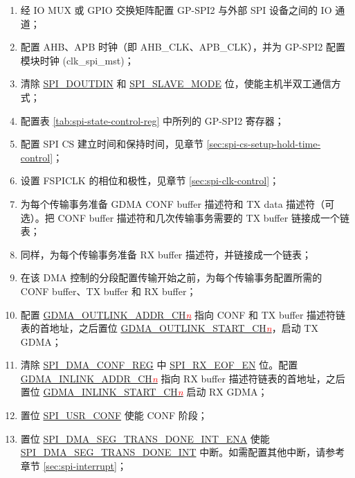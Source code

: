 \documentclass[main\_\_CN.tex]{subfiles}
\begin{document}
 \begin{enumerate}
    \item 经 IO MUX 或 GPIO 交换矩阵配置 GP-SPI2 与外部 SPI 设备之间的 IO 通道；
    \item 配置 AHB、APB 时钟（即 AHB\_CLK、APB\_CLK），并为 GP-SPI2 配置模块时钟 (clk\_spi\_mst)；

    \item 清除 \hyperref[fielddesc:SPIDOUTDIN]{SPI\_DOUTDIN} 和 \hyperref[fielddesc:SPISLAVEMODE]{SPI\_SLAVE\_MODE} 位，使能主机半双工通信方式；

    \item 配置表 \ref{tab:spi-state-control-reg} 中所列的 GP-SPI2 寄存器；

    \item 配置 SPI CS 建立时间和保持时间，见章节  \ref{sec:spi-cs-setup-hold-time-control}；

    \item 设置 FSPICLK 的相位和极性，见章节  \ref{sec:spi-clk-control}；

   \item 为每个传输事务准备 GDMA CONF buffer 描述符和 TX data 描述符（可选）。把 CONF buffer 描述符和几次传输事务需要的 TX buffer 链接成一个链表；

   \item 同样，为每个传输事务准备 RX buffer 描述符，并链接成一个链表；
   \item 在该 DMA 控制的分段配置传输开始之前，为每个传输事务配置所需的 CONF buffer、TX buffer 和 RX buffer；

   \item 配置 \hyperref[fielddesc:GDMAOUTLINKADDRCHN]{GDMA\_OUTLINK\_ADDR\_CH\textcolor{red}{\it{n}}}  指向 CONF 和 TX buffer 描述符链表的首地址，之后置位 \hyperref[fielddesc:GDMAOUTLINKSTARTCHN]{GDMA\_OUTLINK\_START\_CH\textcolor{red}{\it{n}}}，启动 TX GDMA；

   \item 清除 \hyperref[regdesc:SPIDMACONFREG]{SPI\_DMA\_CONF\_REG} 中 \hyperref[fielddesc:SPIRXEOFEN]{SPI\_RX\_EOF\_EN} 位。配置 \hyperref[fielddesc:GDMAINLINKADDRCHN]{GDMA\_INLINK\_ADDR\_CH\textcolor{red}{\it{n}}}  指向 RX buffer 描述符链表的首地址，之后置位 \hyperref[fielddesc:GDMAINLINKSTARTCHN]{GDMA\_INLINK\_START\_CH\textcolor{red}{\it{n}}}  启动 RX GDMA；

   \item 置位 \hyperref[fielddesc:SPIUSRCONF]{SPI\_USR\_CONF} 使能 CONF 阶段；
   \item 置位 \hyperref[fielddesc:SPIDMASEGTRANSDONEINTENA]{SPI\_DMA\_SEG\_TRANS\_DONE\_INT\_ENA} 使能 \hyperref[int:SPIDMASEGTRANSDONEINT]{SPI\_DMA\_SEG\_TRANS\_DONE\_INT} 中断。如需配置其他中断，请参考章节  \ref{sec:spi-interrupt}；


\end{enumerate}
\end{document}
